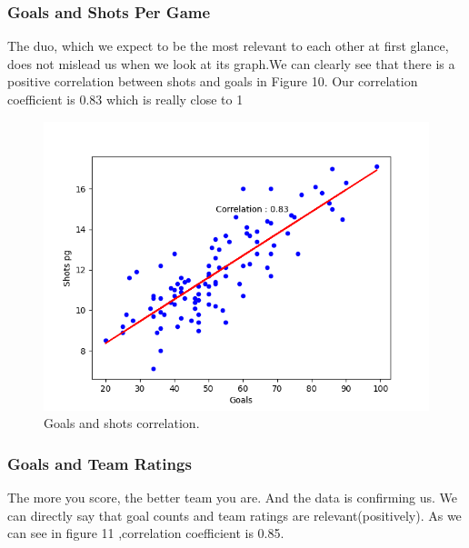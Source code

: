 \documentclass[conference]{IEEEtran}
\begin{document}
\subsubsection{Goals and Shots Per Game}
The duo, which we expect to be the most relevant to each other at first glance, does not mislead us when we look at its graph.We can clearly see that there is a positive correlation between shots and goals in Figure 10. Our correlation coefficient is 0.83 which is really close to 1

\begin{figure}[h]
  \includegraphics[width=\linewidth]{Shots_Goal_corr.png}
  \caption{Goals and shots correlation.}
  \label{fig:Shots_Goal_corr}
\end{figure}

\subsubsection{Goals and Team Ratings}
The more you score, the better team you are. And the data is confirming us. We can directly say that goal counts and team ratings are relevant(positively). As we can see in figure 11 ,correlation coefficient is 0.85.
\end{document}
